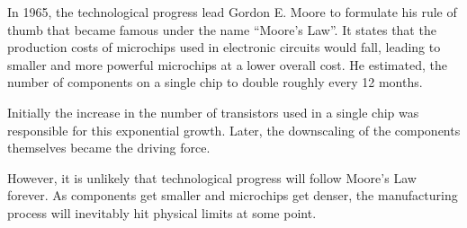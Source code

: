 
In 1965, the technological progress lead Gordon E. Moore to formulate his rule of thumb that became famous under the name ``Moore's Law''. It states that the production costs of microchips used in electronic circuits would fall, leading to smaller and more powerful microchips at a lower overall cost. He estimated, the number of components on a single chip to double roughly every 12 months.

Initially the increase in the number of transistors used in a single chip was responsible for this exponential growth. Later, the downscaling of the components themselves became the driving force.

However, it is unlikely that technological progress will follow Moore's Law forever. As components get smaller and microchips get denser, the manufacturing process will inevitably hit physical limits at some point.


